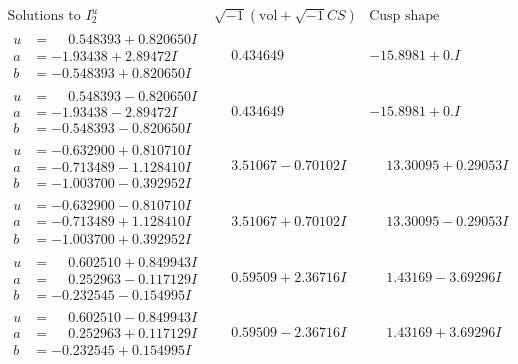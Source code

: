 \documentclass[1p]{elsarticle_modified}
\theoremstyle{definition}
\newcommand{\I}{\sqrt{-1}}
\begin{document}
$$\begin{array}{c|c|c}  
\text{Solutions to }I^u_{2}& \I (\text{vol} + \sqrt{-1}CS) & \text{Cusp shape}\\
 \hline 
\begin{aligned}
u &= \phantom{-}0.548393 + 0.820650 I \\
a &= -1.93438 + 2.89472 I \\
b &= -0.548393 + 0.820650 I\end{aligned}
 & \phantom{-}0.434649\phantom{ +0.000000I} & -15.8981 + 0. I\phantom{ +0.000000I} \\ \hline\begin{aligned}
u &= \phantom{-}0.548393 - 0.820650 I \\
a &= -1.93438 - 2.89472 I \\
b &= -0.548393 - 0.820650 I\end{aligned}
 & \phantom{-}0.434649\phantom{ +0.000000I} & -15.8981 + 0. I\phantom{ +0.000000I} \\ \hline\begin{aligned}
u &= -0.632900 + 0.810710 I \\
a &= -0.713489 - 1.128410 I \\
b &= -1.003700 - 0.392952 I\end{aligned}
 & \phantom{-}3.51067 - 0.70102 I & \phantom{-}13.30095 + 0.29053 I \\ \hline\begin{aligned}
u &= -0.632900 - 0.810710 I \\
a &= -0.713489 + 1.128410 I \\
b &= -1.003700 + 0.392952 I\end{aligned}
 & \phantom{-}3.51067 + 0.70102 I & \phantom{-}13.30095 - 0.29053 I \\ \hline\begin{aligned}
u &= \phantom{-}0.602510 + 0.849943 I \\
a &= \phantom{-}0.252963 - 0.117129 I \\
b &= -0.232545 - 0.154995 I\end{aligned}
 & \phantom{-}0.59509 + 2.36716 I & \phantom{-}1.43169 - 3.69296 I \\ \hline\begin{aligned}
u &= \phantom{-}0.602510 - 0.849943 I \\
a &= \phantom{-}0.252963 + 0.117129 I \\
b &= -0.232545 + 0.154995 I\end{aligned}
 & \phantom{-}0.59509 - 2.36716 I & \phantom{-}1.43169 + 3.69296 I \\ \hline\begin{aligned}

\end{aligned}
\end{array}$$
\end{document}
